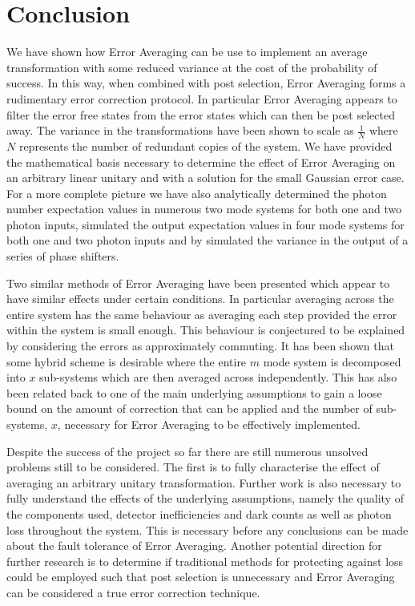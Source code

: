 \documentclass[aps,pra,twocolumn,superscriptaddress,numerical]{revtex4-1}
\begin{document}
\section{Conclusion\label{Conclusion}}
	We have shown how Error Averaging can be use to implement an average transformation with some reduced variance at the cost of the probability of success. In this way, when combined with post selection, Error Averaging forms a rudimentary error correction protocol. In particular Error Averaging appears to filter the error free states from the error states which can then be post selected away. The variance in the transformations have been shown to scale as $\frac{1}{N}$ where $N$ represents the number of redundant copies of the system. We have provided the mathematical basis necessary to determine the effect of Error Averaging on an arbitrary linear unitary and with a solution for the small Gaussian error case. For a more complete picture we have also analytically determined the photon number expectation values in numerous two mode systems for both one and two photon inputs, simulated the output expectation values in four mode systems for both one and two photon inputs and by simulated the variance in the output of a series of phase shifters.
	
	Two similar methods of Error Averaging have been presented which appear to have similar effects under certain conditions. In particular averaging across the entire system has the same behaviour as averaging each step provided the error within the system is small enough. This behaviour is conjectured to be explained by considering the errors as approximately commuting. It has been shown that some hybrid scheme is desirable where the entire $m$ mode system is decomposed into $x$ sub-systems which are then averaged across independently. This has also been related back to one of the main underlying assumptions to gain a loose bound on the amount of correction that can be applied and the number of sub-systems, $x$, necessary for Error Averaging to be effectively implemented.
	
	Despite the success of the project so far there are still numerous unsolved problems still to be considered. The first is to fully characterise the effect of averaging an arbitrary unitary transformation. Further work is also necessary to fully understand the effects of the underlying assumptions, namely the quality of the components used, detector inefficiencies and dark counts as well as photon loss throughout the system. This is necessary before any conclusions can be made about the fault tolerance of Error Averaging. Another potential direction for further research is to determine if traditional methods for protecting against loss \cite{LossCorrectionTim,LossCorrection}  could be employed such that post selection is unnecessary and Error Averaging can be considered a true error correction technique.
	
\end{document}

